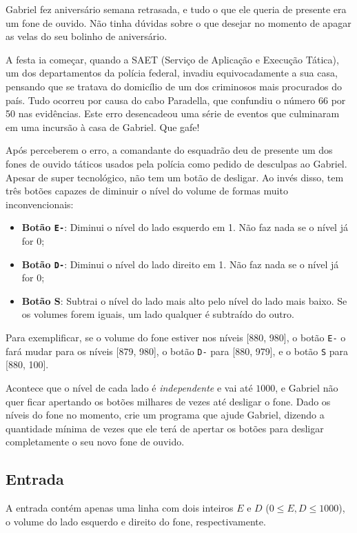 Gabriel fez aniversário semana retrasada, e tudo o que ele queria de presente era um fone de ouvido. Não tinha dúvidas sobre o que desejar no momento de apagar as velas do seu bolinho de aniversário. 

A festa ia começar, quando a SAET (Serviço de Aplicação e Execução Tática), um dos departamentos da polícia federal, invadiu equivocadamente a sua casa, pensando que se tratava do domicílio de um dos criminosos mais procurados do país. Tudo ocorreu por causa do cabo Paradella, que confundiu o número 66 por 50 nas evidências. Este erro desencadeou uma série de eventos que culminaram em uma incursão à casa de Gabriel. Que gafe!

Após perceberem o erro, a comandante do esquadrão deu de presente um dos fones de ouvido táticos usados pela polícia como pedido de desculpas ao Gabriel. Apesar de super tecnológico, não tem um botão de desligar. Ao invés disso, tem três botões capazes de diminuir o nível do volume de formas muito inconvencionais:

\begin{itemize}
\item \textbf{Botão \texttt{E-}}: Diminui o nível do lado esquerdo em 1. Não faz nada se o nível já for 0;
\item \textbf{Botão \texttt{D-}}: Diminui o nível do lado direito em 1. Não faz nada se o nível já for 0;
\item \textbf{Botão S}: Subtrai o nível do lado mais alto pelo nível do lado mais baixo. Se os volumes forem iguais, um lado qualquer é subtraído do outro.
\end{itemize}

Para exemplificar, se o volume do fone estiver nos níveis [880, 980], o botão \texttt{E-} o fará mudar para os níveis [879, 980], o botão \texttt{D-} para [880, 979], e o botão \texttt{S} para [880, 100].

Acontece que o nível de cada lado é \textit{independente} e vai até $1000$, e Gabriel não quer ficar apertando os botões milhares de vezes até desligar o fone. Dado os níveis do fone no momento, crie um programa que ajude Gabriel, dizendo a quantidade mínima de vezes que ele terá de apertar os botões para desligar completamente o seu novo fone de ouvido.

\subsection*{Entrada}
A entrada contém apenas uma linha com dois inteiros $E$ e $D$ ($0 \leq E, D \leq 1000$), o volume do lado esquerdo e direito do fone, respectivamente.

